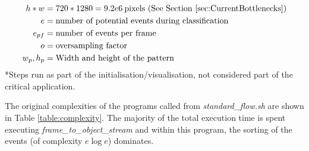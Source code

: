 \documentclass[10pt,twocolumn,letterpaper]{article}
\newcommand{\code}{\textit}
\begin{document}
\begin{table}
{\begin{align*}
            h*w          & = 720*1280 = 9.2e6 \: \text{pixels (See Section \ref{sec:CurrentBottlenecks})} \\
            e            & = \text{number of potential events during classification}                      \\
            e_{pf}       & = \text{number of events per frame}                                            \\
            o            & = \text{oversampling factor}                                                   \\
            w_{p}, h_{p} & = \text{Width and height of the pattern}
        \end{align*}
        *Steps run as part of the initialisation/visualisation, not considered part of the critical application.
    }
    \label{table:complexity}
\end{table}

The original complexities of the programs called from \code{standard\_flow.sh} are shown in Table \ref{table:complexity}. The majority of the total execution time is spent executing \code{frame\_to\_object\_stream} and within this program, the sorting of the events (of complexity $e\log{e}$) dominates.

\nocite{*}

{
    \small
    
    
}
\end{document}
